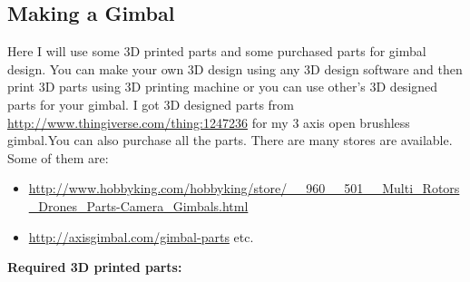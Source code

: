 \documentclass[11pt,a4paper]{article}
\begin{document}
		\subsection{Making a Gimbal}
		Here I will use some 3D printed parts and some purchased parts for gimbal design. You can make your own 3D design using any 3D design software and then print 3D parts using 3D printing machine or you can use other's 3D designed parts for your gimbal. I got 3D designed parts from \url{http://www.thingiverse.com/thing:1247236} for my 3 axis open brushless gimbal.You can also purchase all the parts. There are many stores are available. Some of them are:
		\begin{itemize}
			\item \url{http://www.hobbyking.com/hobbyking/store/__960__501__Multi_Rotors_Drones_Parts-Camera_Gimbals.html}
			\item \url{http://axisgimbal.com/gimbal-parts} etc.
		\end{itemize}
		\textbf{Required 3D printed parts:}
		\newline
\end{document}
